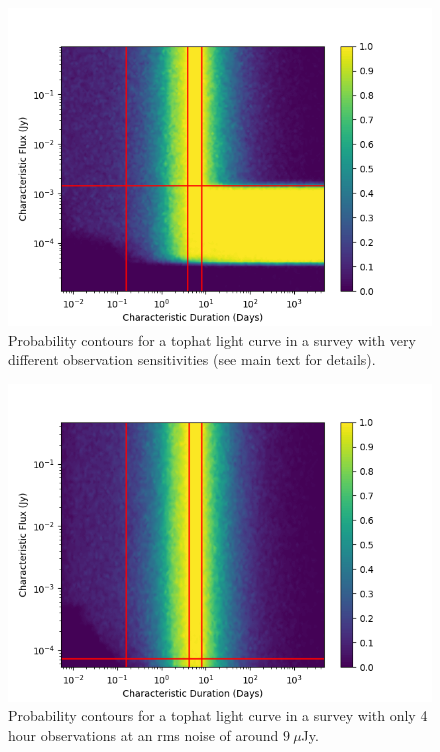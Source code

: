 \documentclass[12pt]{article}
\begin{document}
\begin{figure}
\includegraphics[width=\columnwidth]{figure9.png}
\caption{Probability contours for a tophat light curve in a survey with very different observation sensitivities (see main text for details).}
\label{fig9}
 \end{figure}
 \begin{figure}
\includegraphics[width=\columnwidth]{sample4hr.png}
\caption{Probability contours for a tophat light curve in a survey with only 4 hour observations at an rms noise of around $9~\mu$Jy.}
\label{sample4hr}
 \end{figure}
\end{document}
